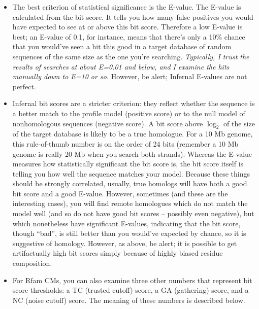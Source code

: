 \begin{itemize}

\item The best criterion of statistical significance is the E-value.
The E-value is calculated from the bit score. It tells you how many
false positives you would have expected to see at or above this bit
score. Therefore a low E-value is best; an E-value of 0.1, for
instance, means that there's only a 10\% chance that you would've seen
a hit this good in a target database of random sequences of the same
size as the one you're searching. {\em
Typically, I trust the results of searches at about E=0.01 and below,
and I examine the hits manually down to E=10 or so.}  However, be
alert; Infernal E-values are not perfect. 

\item Infernal bit scores are a stricter criterion: they reflect
whether the sequence is a better match to the profile model (positive
score) or to the null model of nonhomologous sequences (negative
score).  A bit score above $\log_2$ of the size of the target database
is likely to be a true homologue. For a 10 Mb genome, this
rule-of-thumb number is on the order of 24 bits (remember a 10 Mb
genome is really 20 Mb when you search both strands).  Whereas the
E-value measures how statistically significant the bit score is, the
bit score itself is telling you how well the sequence matches your
model. Because these things should be strongly correlated, usually,
true homologs will have both a good bit score and a good
E-value. However, sometimes (and these are the interesting cases), you
will find remote homologues which do not match the model well (and so
do not have good bit scores -- possibly even negative), but which
nonetheless have significant E-values, indicating that the bit score,
though ``bad'', is still better than you would've expected by chance,
so it is suggestive of homology. However, as above, be alert; it is
possible to get artifactually high bit scores simply because of highly
biased residue composition.
  
\item For Rfam CMs, you can also examine three other numbers that
  represent bit score thresholds: a TC (trusted cutoff) score, a GA
(gathering) score, and a NC (noise cutoff) score. The meaning of
these numbers is described below.
\end{itemize}

